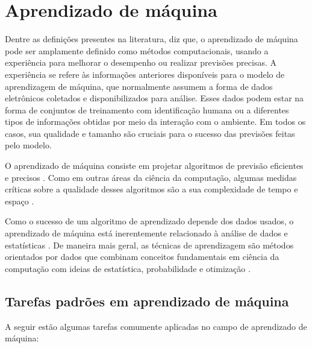 \documentclass[
	12pt,				%
	oneside,			%
	a4paper,			%
	english,			%
	brazil				%
	]{abntex2ppgsi}
\begin{document}
\section{Aprendizado de máquina}
Dentre as definições presentes na literatura,  diz que, o aprendizado de máquina pode ser amplamente definido como métodos computacionais, usando a experiência para melhorar o desempenho ou realizar previsões precisas. A experiência se refere às informações anteriores disponíveis para o modelo de aprendizagem de máquina, que normalmente assumem a forma de dados eletrônicos coletados e disponibilizados para análise. Esses dados podem estar na forma de conjuntos de treinamento com identificação humana ou a diferentes tipos de informações obtidas por meio da interação com o ambiente. Em todos os casos, sua qualidade e tamanho são cruciais para o sucesso das previsões feitas pelo modelo.

O aprendizado de máquina consiste em projetar algoritmos de previsão eficientes e precisos \cite{mohri2018foundations}. Como em outras áreas da ciência da computação, algumas medidas críticas sobre a qualidade desses algoritmos são a sua complexidade de tempo e espaço \cite{mohri2018foundations}.

Como o sucesso de um algoritmo de aprendizado depende dos dados usados, o aprendizado de máquina está inerentemente relacionado à análise de dados e estatísticas \cite{mohri2018foundations}. De maneira mais geral, as técnicas de aprendizagem são métodos orientados por dados que combinam conceitos fundamentais em ciência da computação com ideias de estatística, probabilidade e otimização \cite{mohri2018foundations}.

\subsection{Tarefas padrões em aprendizado de máquina}
A seguir estão algumas tarefas comumente aplicadas no campo de aprendizado de máquina:
\end{document}
